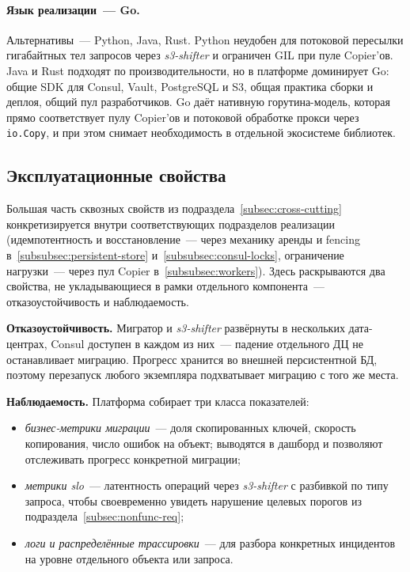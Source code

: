 \paragraph{Язык реализации~--- Go.}
Альтернативы~--- Python, Java, Rust.
Python неудобен для потоковой пересылки гигабайтных тел запросов через \textit{s3-shifter} и ограничен GIL при пуле Copier'ов.
Java и Rust подходят по производительности, но в платформе доминирует Go: общие SDK для Consul, Vault, PostgreSQL и S3, общая практика сборки и деплоя, общий пул разработчиков.
Go даёт нативную горутина-модель, которая прямо соответствует пулу Copier'ов и потоковой обработке прокси через \texttt{io.Copy}, и при этом снимает необходимость в отдельной экосистеме библиотек.

\subsection{Эксплуатационные свойства}\label{subsec:cross-cutting-impl}

Большая часть сквозных свойств из подраздела~\ref{subsec:cross-cutting} конкретизируется внутри соответствующих подразделов реализации (идемпотентность и восстановление~--- через механику аренды и fencing в~\ref{subsubsec:persistent-store} и~\ref{subsubsec:consul-locks}, ограничение нагрузки~--- через пул Copier в~\ref{subsubsec:workers}).
Здесь раскрываются два свойства, не укладывающиеся в рамки отдельного компонента~--- отказоустойчивость и наблюдаемость.

\textbf{Отказоустойчивость.}
Мигратор и \textit{s3-shifter} развёрнуты в нескольких дата-центрах, Consul доступен в каждом из них~--- падение отдельного ДЦ не останавливает миграцию.
Прогресс хранится во внешней персистентной БД, поэтому перезапуск любого экземпляра подхватывает миграцию с того же места.

\textbf{Наблюдаемость.}
Платформа собирает три класса показателей:
\begin{itemize}
    \item \textit{бизнес-метрики миграции}~--- доля скопированных ключей, скорость копирования, число ошибок на объект; выводятся в дашборд и позволяют отслеживать прогресс конкретной миграции;
    \item \textit{метрики \gls{slo}}~--- латентность операций через \textit{s3-shifter} с разбивкой по типу запроса, чтобы своевременно увидеть нарушение целевых порогов из подраздела~\ref{subsec:nonfunc-req};
    \item \textit{логи и распределённые трассировки}~--- для разбора конкретных инцидентов на уровне отдельного объекта или запроса.
\end{itemize}

